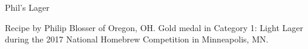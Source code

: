 \begin{recipe}{Phil's Lager} %

\begin{aboutblock}
Recipe by Philip Blosser of Oregon, OH. Gold medal in Category 1: Light Lager
during the 2017 National Homebrew Competition in Minneapolis, MN. \sourceaha
\end{aboutblock}


\begin{methodandtiming}
  
\begin{mashsteps}
\end{mashsteps}

\begin{fermentationsteps}
\end{fermentationsteps}

\end{methodandtiming}

\recipebreak

\begin{ingredientsblock}

\begin{malts}
\end{malts}

\begin{hops}
\end{hops}


\end{ingredientsblock}

\end{recipe}
